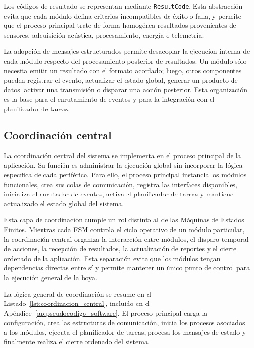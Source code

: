 Los códigos de resultado se representan mediante \texttt{ResultCode}. Esta abstracción evita que cada módulo defina criterios incompatibles de éxito o falla, y permite que el proceso principal trate de forma homogénea resultados provenientes de sensores, adquisición acústica, procesamiento, energía o telemetría.

La adopción de mensajes estructurados permite desacoplar la ejecución interna de cada módulo respecto del procesamiento posterior de resultados. Un módulo sólo necesita emitir un resultado con el formato acordado; luego, otros componentes pueden registrar el evento, actualizar el estado global, generar un producto de datos, activar una transmisión o disparar una acción posterior. Esta organización es la base para el enrutamiento de eventos y para la integración con el planificador de tareas.

\subsection{Coordinación central}
\label{subsec:coordinacion_central}

La coordinación central del sistema se implementa en el proceso principal de la aplicación. Su función es administrar la ejecución global sin incorporar la lógica específica de cada periférico. Para ello, el proceso principal instancia los módulos funcionales, crea sus colas de comunicación, registra las interfaces disponibles, inicializa el enrutador de eventos, activa el planificador de tareas y mantiene actualizado el estado global del sistema.

Esta capa de coordinación cumple un rol distinto al de las Máquinas de Estados Finitos. Mientras cada FSM controla el ciclo operativo de un módulo particular, la coordinación central organiza la interacción entre módulos, el disparo temporal de acciones, la recepción de resultados, la actualización de reportes y el cierre ordenado de la aplicación. Esta separación evita que los módulos tengan dependencias directas entre sí y permite mantener un único punto de control para la ejecución general de la boya.

La lógica general de coordinación se resume en el Listado~\ref{lst:coordinacion_central}, incluido en el Apéndice~\ref{ap:pseudocodigo_software}. El proceso principal carga la configuración, crea las estructuras de comunicación, inicia los procesos asociados a los módulos, ejecuta el planificador de tareas, procesa los mensajes de estado y finalmente realiza el cierre ordenado del sistema.

